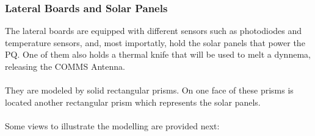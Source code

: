 \subsubsection{Lateral Boards and Solar Panels}
The lateral boards are equipped with different sensors such as photodiodes and temperature sensors, and, most 
importatly, hold the solar panels that power the PQ. One of them also holds a thermal knife that will be used to melt
a dynnema, releasing the COMMS Antenna.

\paragraph{}

They are modeled by solid rectangular prisms. On one face of these prisms is located another rectangular prism which
represents the solar panels.

\paragraph{}

Some views to illustrate the modelling are provided next:

